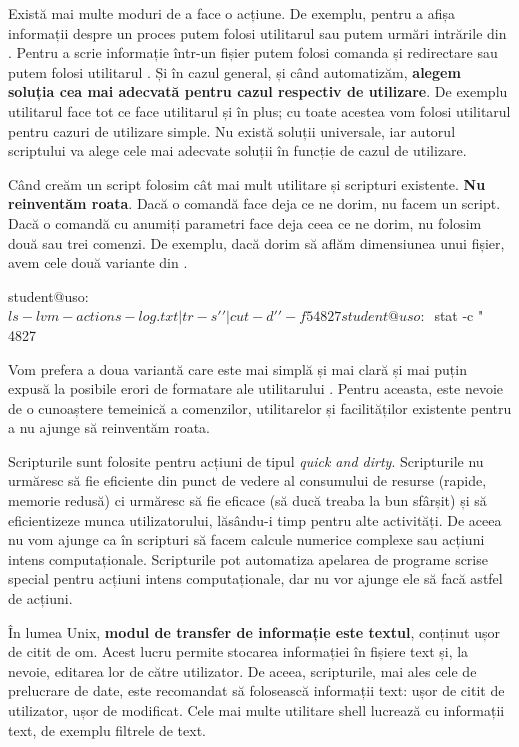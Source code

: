 Există mai multe moduri de a face o acțiune.
De exemplu, pentru a afișa informații despre un proces putem folosi utilitarul  sau putem urmări intrările din .
Pentru a scrie informație într-un fișier putem folosi comanda  și redirectare sau putem folosi utilitarul .
Și în cazul general, și când automatizăm, \textbf{alegem soluția cea mai adecvată pentru cazul respectiv de utilizare}.
De exemplu utilitarul  face tot ce face utilitarul  și în plus; cu toate acestea vom folosi utilitarul  pentru cazuri de utilizare simple.
Nu există soluții universale, iar autorul scriptului va alege cele mai adecvate soluții în funcție de cazul de utilizare.

Când creăm un script folosim cât mai mult utilitare și scripturi existente.
\textbf{Nu reinventăm roata}.
Dacă o comandă face deja ce ne dorim, nu facem un script.
Dacă o comandă cu anumiți parametri face deja ceea ce ne dorim, nu folosim două sau trei comenzi.
De exemplu, dacă dorim să aflăm dimensiunea unui fișier, avem cele două variante din .

\begin{screen}[caption={Afișarea informațiilor despre un fișier (ls vs stat)},label={lst:auto:ls-vs-stat}]
student@uso:~$ ls -l vm-actions-log.txt  | tr -s ' ' | cut -d ' ' -f 5
4827
student@uso:~$ stat -c "%
4827
\end{screen}

Vom prefera a doua variantă care este mai simplă și mai clară și mai puțin expusă la posibile erori de formatare ale utilitarului .
Pentru aceasta, este nevoie de o cunoaștere temeinică a comenzilor, utilitarelor și facilităților existente pentru a nu ajunge să reinventăm roata.

Scripturile sunt folosite pentru acțiuni de tipul \textit{quick and dirty}.
Scripturile nu urmăresc să fie eficiente din punct de vedere al consumului de resurse (rapide, memorie redusă) ci urmăresc să fie eficace (să ducă treaba la bun sfârșit) și să eficientizeze munca utilizatorului, lăsându-i timp pentru alte activități.
De aceea nu vom ajunge ca în scripturi să facem calcule numerice complexe sau acțiuni intens computaționale.
Scripturile pot automatiza apelarea de programe scrise special pentru acțiuni intens computaționale, dar nu vor ajunge ele să facă astfel de acțiuni.

În lumea Unix, \textbf{modul de transfer de informație este textul}, conținut ușor de citit de om.
Acest lucru permite stocarea informației în fișiere text și, la nevoie, editarea lor de către utilizator.
De aceea, scripturile, mai ales cele de prelucrare de date, este recomandat să folosească informații text: ușor de citit de utilizator, ușor de modificat.
Cele mai multe utilitare shell lucrează cu informații text, de exemplu filtrele de text.

